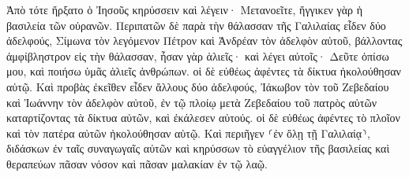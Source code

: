 \documentclass{openreader}
\begin{document}
Ἀπὸ τότε ἤρξατο ὁ Ἰησοῦς κηρύσσειν καὶ λέγειν· Μετανοεῖτε, ἤγγικεν γὰρ ἡ βασιλεία τῶν οὐρανῶν. 
Περιπατῶν δὲ παρὰ τὴν θάλασσαν τῆς Γαλιλαίας εἶδεν δύο ἀδελφούς, Σίμωνα τὸν λεγόμενον Πέτρον καὶ Ἀνδρέαν τὸν ἀδελφὸν αὐτοῦ, βάλλοντας ἀμφίβληστρον εἰς τὴν θάλασσαν, ἦσαν γὰρ ἁλιεῖς· 
καὶ λέγει αὐτοῖς· Δεῦτε ὀπίσω μου, καὶ ποιήσω ὑμᾶς ἁλιεῖς ἀνθρώπων. 
οἱ δὲ εὐθέως ἀφέντες τὰ δίκτυα ἠκολούθησαν αὐτῷ. 
Καὶ προβὰς ἐκεῖθεν εἶδεν ἄλλους δύο ἀδελφούς, Ἰάκωβον τὸν τοῦ Ζεβεδαίου καὶ Ἰωάννην τὸν ἀδελφὸν αὐτοῦ, ἐν τῷ πλοίῳ μετὰ Ζεβεδαίου τοῦ πατρὸς αὐτῶν καταρτίζοντας τὰ δίκτυα αὐτῶν, καὶ ἐκάλεσεν αὐτούς. 
οἱ δὲ εὐθέως ἀφέντες τὸ πλοῖον καὶ τὸν πατέρα αὐτῶν ἠκολούθησαν αὐτῷ. 
Καὶ περιῆγεν ⸂ἐν ὅλῃ τῇ Γαλιλαίᾳ⸃, διδάσκων ἐν ταῖς συναγωγαῖς αὐτῶν καὶ κηρύσσων τὸ εὐαγγέλιον τῆς βασιλείας καὶ θεραπεύων πᾶσαν νόσον καὶ πᾶσαν μαλακίαν ἐν τῷ λαῷ. 
\end{document}
